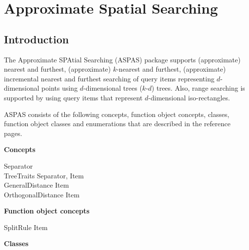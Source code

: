 \chapter{Approximate Spatial Searching}

\section{Introduction}

The Approximate SPAtial Searching (ASPAS) package supports
(approximate) nearest and furthest, (approximate) $k$-nearest and furthest, (approximate) incremental nearest
and furthest searching of query items representing $d$-dimensional
points using $d$-dimensional trees
($k$-$d$) trees. Also, range searching is supported by using query items that represent
$d$-dimensional iso-rectangles.

ASPAS consists of the following concepts, function object concepts, classes, function object classes
and enumerations that are described in the reference pages.

{\bf Concepts}

Separator \\
TreeTraits \ccOpenAngle Separator, Item\ccCloseAngle \\
GeneralDistance \ccOpenAngle Item\ccCloseAngle \\
OrthogonalDistance \ccOpenAngle Item\ccCloseAngle

{\bf Function object concepts}

SplitRule \ccOpenAngle Item\ccCloseAngle

{\bf Classes}

 \\
 \\
 \\
 \\
 \\
 \\
 \\
 \\
 \\
 \\
 \\
 \\
 \\

